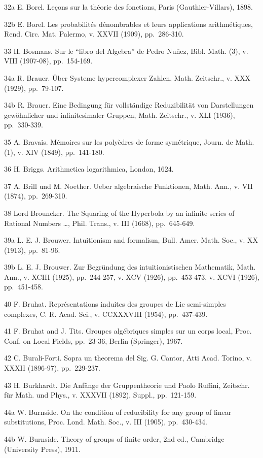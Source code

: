 32a E. Borel. Leçons sur la théorie des fonctions, Paris (Gauthier-Villars), 1898.

32b E. Borel. Les probabilités dénombrables et leurs applications arithmétiques, Rend. Circ. Mat. Palermo, v. XXVII (1909), pp.~286-310.

33 H. Bosmans. Sur le ``libro del Algebra'' de Pedro Nuñez, Bibl. Math. (3), v. VIII (1907-08), pp.~154-169.

34a R. Brauer. Über Systeme hypercomplexer Zahlen, Math. Zeitschr., v. XXX (1929), pp.~79-107.

34b R. Brauer. Eine Bedingung für vollständige Reduzibilität von Darstellungen gewöhnlicher und infinitesimaler Gruppen, Math. Zeitschr., v. XLI (1936), pp.~330-339.

35 A. Bravais. Mémoires sur les polyèdres de forme symétrique, Journ. de Math. (1), v. XIV (1849), pp.~141-180.

36 H. Briggs. Arithmetica logarithmica, London, 1624.

37 A. Brill und M. Noether. Ueber algebraische Funktionen, Math. Ann., v. VII (1874), pp.~269-310.

38 Lord Brouncker. The Squaring of the Hyperbola by an infinite series of Rational Numbers \ldots, Phil. Trans., v. III (1668), pp.~645-649.

39a L. E. J. Brouwer. Intuitionism and formalism, Bull. Amer. Math. Soc., v. XX (1913), pp.~81-96.

39b L. E. J. Brouwer. Zur Begründung des intuitionistischen Mathematik, Math. Ann., v. XCIII (1925), pp.~244-257, v. XCV (1926), pp.~453-473, v. XCVI (1926), pp.~451-458.

40 F. Bruhat. Représentations induites des groupes de Lie semi-simples complexes, C. R. Acad. Sci., v. CCXXXVIII (1954), pp.~437-439.

41 F. Bruhat and J. Tits. Groupes algébriques simples sur un corps local, Proc. Conf. on Local Fields, pp.~23-36, Berlin (Springer), 1967.

42 C. Burali-Forti. Sopra un theorema del Sig. G. Cantor, Atti Acad. Torino, v. XXXII (1896-97), pp.~229-237.

43 H. Burkhardt. Die Anfänge der Gruppentheorie und Paolo Ruffini, Zeitschr. für Math. und Phys., v. XXXVII (1892), Suppl., pp.~121-159.

44a W. Burnside. On the condition of reducibility for any group of linear substitutions, Proc. Lond. Math. Soc., v. III (1905), pp.~430-434.

44b W. Burnside. Theory of groups of finite order, 2nd ed., Cambridge (University Press), 1911.

